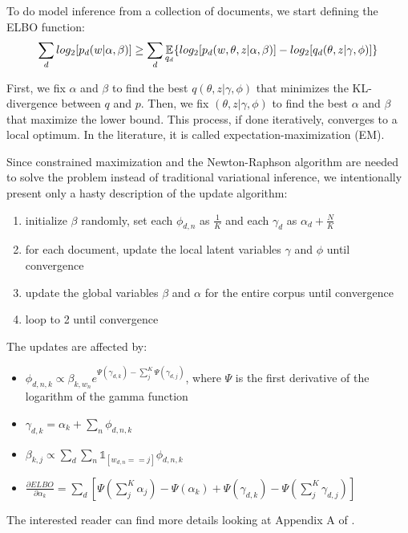 To do model inference from a collection of documents, we start defining the ELBO function:
\begin{equation*}
    \sum_d log_2 [p_d(w | \alpha, \beta)] \geq \sum_d \operatorname*{\mathbb{E}}_{q_d} \{ log_2[p_d(w, \theta, z | \alpha, \beta)] - log_2[q_d(\theta, z | \gamma, \phi)] \}
\end{equation*}

First, we fix $\alpha$ and $\beta$ to find the best $q(\theta, z | \gamma, \phi)$ that minimizes the KL-divergence between $q$ and $p$.
Then, we fix $(\theta, z | \gamma, \phi)$ to find the best $\alpha$ and $\beta$ that maximize the lower bound.
This process, if done iteratively, converges to a local optimum.
In the literature, it is called expectation-maximization (EM).

Since constrained maximization and
the Newton-Raphson algorithm are needed to solve the problem
instead of traditional variational inference,
we intentionally present only a hasty description of the update algorithm:
\begin{enumerate}
    \item initialize $\beta$ randomly, set each $\phi_{d,n}$ as $\frac{1}{K}$ and each $\gamma_d$ as $\alpha_d + \frac{N}{K}$
    \item for each document, update the local latent variables $\gamma$ and $\phi$ until convergence
    \item update the global variables $\beta$ and $\alpha$ for the entire corpus until convergence
    \item loop to 2 until convergence
\end{enumerate}

The updates are affected by:
\begin{itemize}
    \item $\phi_{d,n,k} \propto \beta_{k, w_n} e^{\Psi(\gamma_{d,k}) - \sum_j^K \Psi(\gamma_{d,j})}$, where $\Psi$ is the first derivative of the logarithm of the gamma function
    \item $\gamma_{d,k} = \alpha_k + \sum_n \phi_{d,n,k}$
    \item $\beta_{k,j} \propto \sum_d \sum_n \mathbb{1}_{[w_{d,n} == j]} \phi_{d,n,k}$
    \item $\frac{\partial \mathit{ELBO}}{ \partial \alpha_k} = \sum_d [ \Psi(\sum_j^K \alpha_j) - \Psi(\alpha_k) + \Psi(\gamma_{d,k}) - \Psi(\sum_j^K \gamma_{d,j})]$
\end{itemize}

The interested reader can find more details looking at Appendix A of \cite{DBLP:journals/jmlr/BleiNJ03}.

